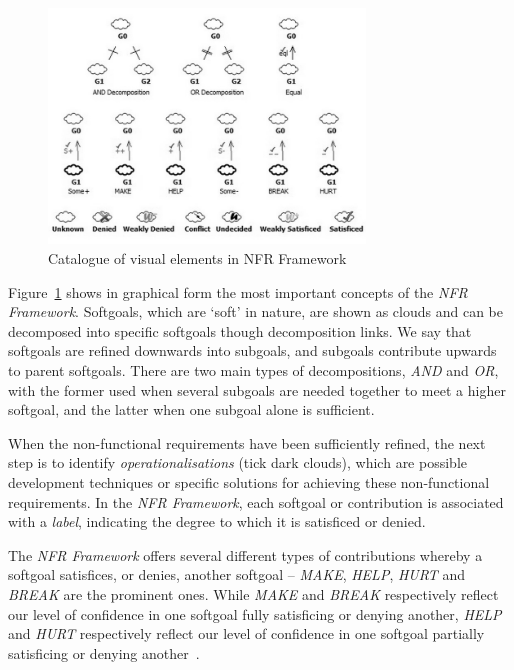 \documentclass[dissertation,final]{softeng}
\begin{document}
\begin{figure}[h]
\includegraphics[width=0.75\textwidth]{SIGLegend}
\centering
\caption[Catalogue of visual elements in NFR Framework]{Catalogue of visual elements in NFR Framework~\footnotemark}
\label{fig:sig_legend}
\end{figure}

Figure~\ref{fig:sig_legend} shows in graphical form the most important concepts of the \emph{NFR Framework}. Softgoals, which are `soft' in nature, are shown as clouds and can be decomposed into specific softgoals though decomposition links. We say that softgoals are refined downwards into subgoals, and subgoals contribute upwards to parent softgoals. There are two main types of decompositions, \emph{AND} and \emph{OR}, with the former used when several subgoals are needed together to meet a higher softgoal, and the latter when one subgoal alone is sufficient. 

When the non-functional requirements have been sufficiently refined, the next step is to identify \emph{operationalisations} (tick dark clouds), which are possible development techniques or specific solutions for achieving these non-functional requirements. In the \emph{NFR Framework}, each softgoal or contribution is associated with a \emph{label}, indicating the degree to which it is satisficed or denied.

The \emph{NFR Framework} offers several different types of contributions whereby a softgoal satisfices, or denies, another softgoal -- \emph{MAKE}, \emph{HELP}, \emph{HURT} and \emph{BREAK} are the prominent ones. While \emph{MAKE} and \emph{BREAK} respectively reflect our level of confidence in one softgoal fully satisficing or denying another, \emph{HELP} and \emph{HURT} respectively reflect our level of confidence in one softgoal partially satisficing or denying another~\citep{Chung:2009vg}. 
\end{document}
